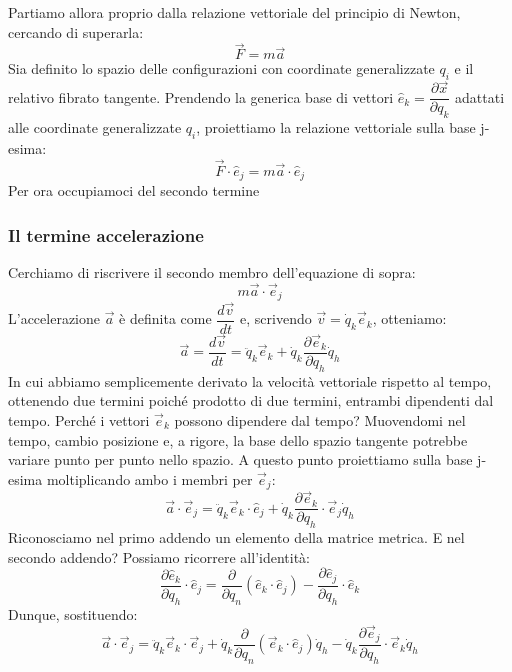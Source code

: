 \documentclass[a4paper,openany]{article}
\begin{document}
	Partiamo allora proprio dalla relazione vettoriale del principio di Newton, cercando di superarla:
	$$
	\vec{F} = m\vec{a}
	$$
	Sia definito lo spazio delle configurazioni con coordinate generalizzate $q_{i}$ e il relativo fibrato tangente. Prendendo la generica base di vettori $\displaystyle \hat{e}_{k} = \dfrac{\partial \vec{x}}{\partial q_{k}}$ adattati alle coordinate generalizzate $q_{i}$, proiettiamo la relazione vettoriale sulla base j-esima:
	$$
	\vec{F}\cdot\hat{e}_{j} = m\vec{a}\cdot\hat{e}_{j}
	$$
	Per ora occupiamoci del secondo termine
	\subsubsection{Il termine accelerazione}
	Cerchiamo di riscrivere il secondo membro dell'equazione di sopra:
	$$
	m\vec{a}\cdot\vec{e}_{j}
	$$
	L'accelerazione $\vec{a}$ è definita come $\dfrac{d\vec{v}}{dt}$ e, scrivendo $\vec{v}= \dot{q}_{k}\vec{e}_{k}$, otteniamo:
	\begin{equation}
		\vec{a} = \dfrac{d\vec{v}}{dt} = \ddot{q}_{k}\vec{e}_{k} + \dot{q}_{k}\dfrac{\partial \vec{e}_{k}}{\partial q_{h}}\dot{q}_{h}
	\end{equation}
	In cui abbiamo semplicemente derivato la velocità vettoriale rispetto al tempo, ottenendo due termini poiché prodotto di due termini, entrambi dipendenti dal tempo. Perché i vettori $\vec{e}_{k}$ possono dipendere dal tempo? Muovendomi nel tempo, cambio posizione e, a rigore, la base dello spazio tangente potrebbe variare punto per punto nello spazio. A questo punto proiettiamo sulla base j-esima moltiplicando ambo i membri per $\vec{e}_{j}$:
	\begin{equation}
		\vec{a}\cdot\vec{e}_{j} = \ddot{q}_{k}\vec{e}_{k}\cdot\hat{e}_{j} + \dot{q}_{k}\dfrac{\partial \vec{e}_{k}}{\partial q_{h}}\cdot \vec{e}_{j}\dot{q}_{h}
	\end{equation}
	Riconosciamo nel primo addendo un elemento della matrice metrica. E nel secondo addendo? Possiamo ricorrere all'identità:
	\begin{equation}
		\dfrac{\partial \hat{e}_{k}}{\partial q_{h}}\cdot\hat{e}_{j} = \dfrac{\partial}{\partial q_{n}}(\hat{e}_{k}\cdot\hat{e}_{j})-\dfrac{\partial \hat{e}_{j}}{\partial q_{h}}\cdot\hat{e}_{k}
	\end{equation}
	Dunque, sostituendo:
	\begin{equation}
		\vec{a}\cdot\vec{e}_{j} = \ddot{q}_{k}\vec{e}_{k}\cdot\vec{e}_{j} + \dot{q}_{k} \dfrac{\partial}{\partial q_{n}}(\vec{e}_{k}\cdot\hat{e}_{j})\dot{q}_{h} -  \dot{q}_{k}\dfrac{\partial \vec{e}_{j}}{\partial q_{h}}\cdot \vec{e}_{k}\dot{q}_{h}
	\end{equation}
\end{document}
